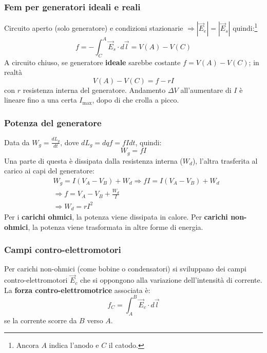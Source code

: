 \documentclass[10pt, a4paper]{scrartcl}
\numberwithin{equation}{subsection}
\theoremstyle{style1}
\begin{document}
\subsubsection{Fem per generatori ideali e reali}

Circuito aperto (solo generatore) e condizioni stazionarie $\Rightarrow \left\lvert \vec{E}_e \right\rvert = \left\lvert \vec{E}_s \right\rvert$ quindi:\footnote{Ancora $A$ indica l'anodo e $C$ il catodo.}
\begin{equation}
	f = -\int_{C} ^A \vec{E}_s \cdot d\vec{l} =V(A) - V(C)
\end{equation}
A circuito chiuso, se generatore \textbf{ideale} sarebbe costante $f = V(A) - V(C)$; in realt\`a 
\begin{equation}
	V(A) - V(C) = f - rI
\end{equation}
con $r$ resistenza interna del generatore. Andamento $\Delta V$ all'aumentare di $I$ \`e lineare fino a una certa $I_\text{max}$, dopo di che crolla a picco.
\subsubsection{Potenza del generatore}
Data da $W_g = \frac{d L_g}{d t} $, dove $dL_g = dq f = fI dt$, quindi:
\begin{equation}
	W_g = fI
\end{equation}
Una parte di questa \`e dissipata dalla resistenza interna ($W_d$), l'altra trasferita al carico ai capi del generatore:
\begin{equation}
	\begin{split}
		&W_g = I (V_A -V_B) + W_d \Rightarrow  fI = I (V_A -V_B) + W_d\\
		&\Rightarrow f = V_A -V_B + \frac{W_d}{I}\\
		&\Rightarrow W_d = rI^2
	\end{split}
\end{equation}
Per i \textbf{carichi ohmici}, la potenza viene dissipata in calore. Per \textbf{carichi non-ohmici}, la potenza viene trasformata in altre forme di energia. 

\subsubsection{Campi contro-elettromotori}

Per carichi non-ohmici (come bobine o condensatori) si sviluppano dei campi contro-elettromotori $\vec{E}_c$ che si oppongono alla variazione dell'intensit\`a di corrente. La \textbf{forza contro-elettromotrice} associata \`e:
\begin{equation}
	f_C = \int_{A} ^B \vec{E}_c \cdot d\vec{l}
\end{equation}
se la corrente scorre da $B$ verso $A$.
\end{document}
